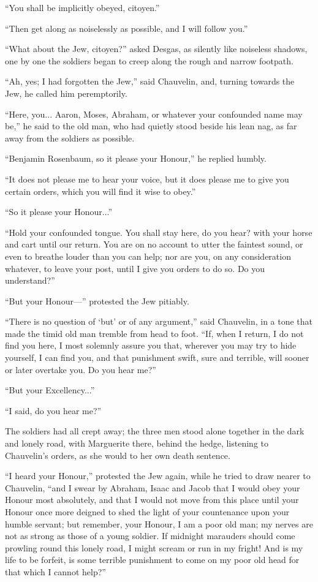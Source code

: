 \documentclass[paper=5.5in:8.5in,BCOR=7mm,twoside,DIV=calc,12pt,usegeometry,chapterprefix,endperiod,headings=big]{scrbook}
\begin{document}
\enquote{You shall be implicitly obeyed, citoyen.}

\enquote{Then get along as noiselessly as possible, and I will follow you.}

\enquote{What about the Jew, citoyen?} asked Desgas, as silently like noiseless shadows, one by one the soldiers began to creep along the rough and narrow footpath.

\enquote{Ah, yes; I had forgotten the Jew,} said Chauvelin, and, turning towards the Jew, he called him peremptorily.

\enquote{Here, you... Aaron, Moses, Abraham, or whatever your confounded name may be,} he said to the old man, who had quietly stood beside his lean nag, as far away from the soldiers as possible.

\enquote{Benjamin Rosenbaum, so it please your Honour,} he replied humbly.

\enquote{It does not please me to hear your voice, but it does please me to give you certain orders, which you will find it wise to obey.}

\enquote{So it please your Honour...}

\enquote{Hold your confounded tongue. You shall stay here, do you hear? with your horse and cart until our return. You are on no account to utter the faintest sound, or even to breathe louder than you can help; nor are you, on any consideration whatever, to leave your post, until I give you orders to do so. Do you understand?}

\enquote{But your Honour---} protested the Jew pitiably.

\enquote{There is no question of \enquote{but} or of any argument,} said Chauvelin, in a tone that made the timid old man tremble from head to foot. \enquote{If, when I return, I do not find you here, I most solemnly assure you that, wherever you may try to hide yourself, I can find you, and that punishment swift, sure and terrible, will sooner or later overtake you. Do you hear me?}

\enquote{But your Excellency...}

\enquote{I said, do you hear me?}

The soldiers had all crept away; the three men stood alone together in the dark and lonely road, with Marguerite there, behind the hedge, listening to Chauvelin's orders, as she would to her own death sentence.

\enquote{I heard your Honour,} protested the Jew again, while he tried to draw nearer to Chauvelin, \enquote{and I swear by Abraham, Isaac and Jacob that I would obey your Honour most absolutely, and that I would not move from this place until your Honour once more deigned to shed the light of your countenance upon your humble servant; but remember, your Honour, I am a poor old man; my nerves are not as strong as those of a young soldier. If midnight marauders should come prowling round this lonely road, I might scream or run in my fright! And is my life to be forfeit, is some terrible punishment to come on my poor old head for that which I cannot help?}
\end{document}
